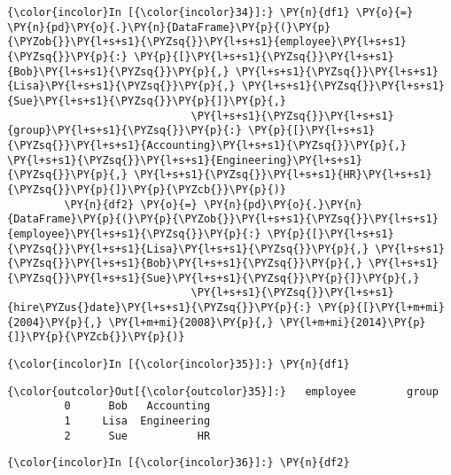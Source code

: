     \begin{Verbatim}[commandchars=\\\{\},frame=single,framerule=0.3mm,rulecolor=\color{cellframecolor}]
{\color{incolor}In [{\color{incolor}34}]:} \PY{n}{df1} \PY{o}{=} \PY{n}{pd}\PY{o}{.}\PY{n}{DataFrame}\PY{p}{(}\PY{p}{\PYZob{}}\PY{l+s+s1}{\PYZsq{}}\PY{l+s+s1}{employee}\PY{l+s+s1}{\PYZsq{}}\PY{p}{:} \PY{p}{[}\PY{l+s+s1}{\PYZsq{}}\PY{l+s+s1}{Bob}\PY{l+s+s1}{\PYZsq{}}\PY{p}{,} \PY{l+s+s1}{\PYZsq{}}\PY{l+s+s1}{Lisa}\PY{l+s+s1}{\PYZsq{}}\PY{p}{,} \PY{l+s+s1}{\PYZsq{}}\PY{l+s+s1}{Sue}\PY{l+s+s1}{\PYZsq{}}\PY{p}{]}\PY{p}{,}
                             \PY{l+s+s1}{\PYZsq{}}\PY{l+s+s1}{group}\PY{l+s+s1}{\PYZsq{}}\PY{p}{:} \PY{p}{[}\PY{l+s+s1}{\PYZsq{}}\PY{l+s+s1}{Accounting}\PY{l+s+s1}{\PYZsq{}}\PY{p}{,} \PY{l+s+s1}{\PYZsq{}}\PY{l+s+s1}{Engineering}\PY{l+s+s1}{\PYZsq{}}\PY{p}{,} \PY{l+s+s1}{\PYZsq{}}\PY{l+s+s1}{HR}\PY{l+s+s1}{\PYZsq{}}\PY{p}{]}\PY{p}{\PYZcb{}}\PY{p}{)}
         \PY{n}{df2} \PY{o}{=} \PY{n}{pd}\PY{o}{.}\PY{n}{DataFrame}\PY{p}{(}\PY{p}{\PYZob{}}\PY{l+s+s1}{\PYZsq{}}\PY{l+s+s1}{employee}\PY{l+s+s1}{\PYZsq{}}\PY{p}{:} \PY{p}{[}\PY{l+s+s1}{\PYZsq{}}\PY{l+s+s1}{Lisa}\PY{l+s+s1}{\PYZsq{}}\PY{p}{,} \PY{l+s+s1}{\PYZsq{}}\PY{l+s+s1}{Bob}\PY{l+s+s1}{\PYZsq{}}\PY{p}{,} \PY{l+s+s1}{\PYZsq{}}\PY{l+s+s1}{Sue}\PY{l+s+s1}{\PYZsq{}}\PY{p}{]}\PY{p}{,}
                             \PY{l+s+s1}{\PYZsq{}}\PY{l+s+s1}{hire\PYZus{}date}\PY{l+s+s1}{\PYZsq{}}\PY{p}{:} \PY{p}{[}\PY{l+m+mi}{2004}\PY{p}{,} \PY{l+m+mi}{2008}\PY{p}{,} \PY{l+m+mi}{2014}\PY{p}{]}\PY{p}{\PYZcb{}}\PY{p}{)}
\end{Verbatim}


    \begin{Verbatim}[commandchars=\\\{\},frame=single,framerule=0.3mm,rulecolor=\color{cellframecolor}]
{\color{incolor}In [{\color{incolor}35}]:} \PY{n}{df1}
\end{Verbatim}


\begin{Verbatim}[commandchars=\\\{\},frame=single,framerule=0.3mm,rulecolor=\color{cellframecolor}]
{\color{outcolor}Out[{\color{outcolor}35}]:}   employee        group
         0      Bob   Accounting
         1     Lisa  Engineering
         2      Sue           HR
\end{Verbatim}
            
    \begin{Verbatim}[commandchars=\\\{\},frame=single,framerule=0.3mm,rulecolor=\color{cellframecolor}]
{\color{incolor}In [{\color{incolor}36}]:} \PY{n}{df2}
\end{Verbatim}


